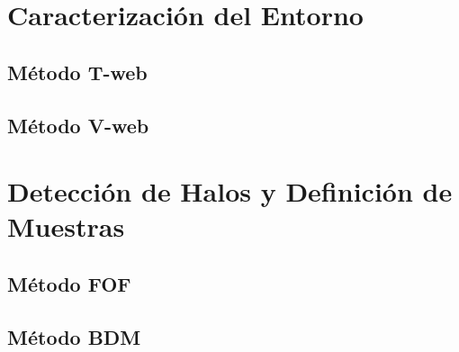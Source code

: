 


\section{Caracterización del Entorno}
\label{sec:EnvironmentCharacterization}


	\subsection{Método T-web}
	\label{subsec:TheT-webMethod}


	\subsection{Método V-web}
	\label{subsec:TheV-webMethod}






\section{Detección de Halos y Definición de Muestras}
\label{sec:HalosDetectionAndSampleDefinitions}


	\subsection{Método FOF}
	\label{subsec:FOFMethod}


	\subsection{Método BDM}
	\label{subsec:BDMMethod}
	
